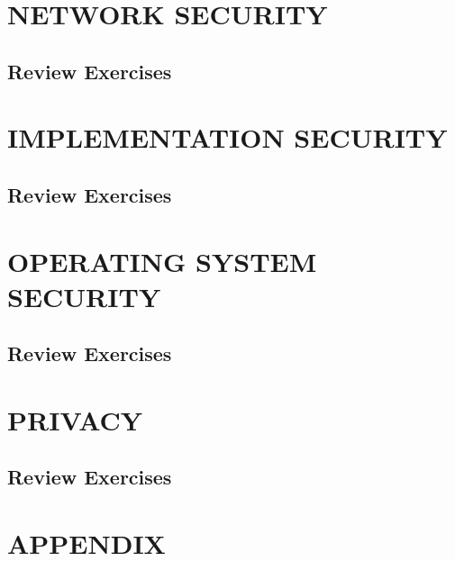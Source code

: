 \documentclass[a4paper, 10 pt, conference]{ieeeconf}
\begin{document}
\section{\textbf{NETWORK SECURITY}}
\subsection{\textbf{Review Exercises}}






\section{\textbf{IMPLEMENTATION SECURITY}}
\subsection{\textbf{Review Exercises}}






\section{\textbf{OPERATING SYSTEM SECURITY}}
\subsection{\textbf{Review Exercises}}






\section{\textbf{PRIVACY}}
\subsection{\textbf{Review Exercises}}

\section*{APPENDIX}



\end{document}

